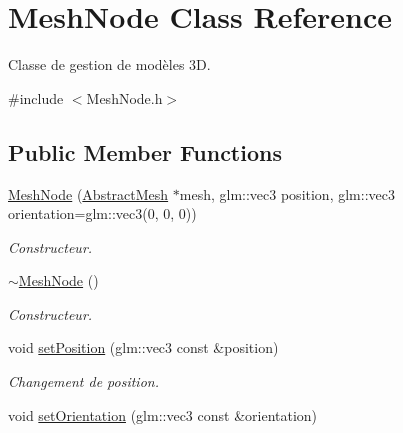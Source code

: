 \hypertarget{classMeshNode}{\section{Mesh\+Node Class Reference}
\label{classMeshNode}
}


Classe de gestion de modèles 3\+D.  




{\ttfamily \#include $<$Mesh\+Node.\+h$>$}

\subsection*{Public Member Functions}
\begin{DoxyCompactItemize}
\item 
\hypertarget{classMeshNode_ae0bd876e5fcb2adbf3de54823dedd99e}{\hyperlink{classMeshNode_ae0bd876e5fcb2adbf3de54823dedd99e}{Mesh\+Node} (\hyperlink{classAbstractMesh}{Abstract\+Mesh} $\ast$mesh, glm\+::vec3 position, glm\+::vec3 orientation=glm\+::vec3(0, 0, 0))}\label{classMeshNode_ae0bd876e5fcb2adbf3de54823dedd99e}

\begin{DoxyCompactList}\small\item\em Constructeur. \end{DoxyCompactList}\item 
\hypertarget{classMeshNode_abf8b858b11632dc9827b3ffa1cdc8c9b}{\hyperlink{classMeshNode_abf8b858b11632dc9827b3ffa1cdc8c9b}{$\sim$\+Mesh\+Node} ()}\label{classMeshNode_abf8b858b11632dc9827b3ffa1cdc8c9b}

\begin{DoxyCompactList}\small\item\em Constructeur. \end{DoxyCompactList}\item 
\hypertarget{classMeshNode_af597b2103f1cf7b226b2171474005cdc}{void \hyperlink{classMeshNode_af597b2103f1cf7b226b2171474005cdc}{set\+Position} (glm\+::vec3 const \&position)}\label{classMeshNode_af597b2103f1cf7b226b2171474005cdc}

\begin{DoxyCompactList}\small\item\em Changement de position. \end{DoxyCompactList}\item 
\hypertarget{classMeshNode_a60d28573a39499ea15e6bbc09b3d6c22}{void \hyperlink{classMeshNode_a60d28573a39499ea15e6bbc09b3d6c22}{set\+Orientation} (glm\+::vec3 const \&orientation)}\label{classMeshNode_a60d28573a39499ea15e6bbc09b3d6c22}


\end{DoxyCompactItemize}
